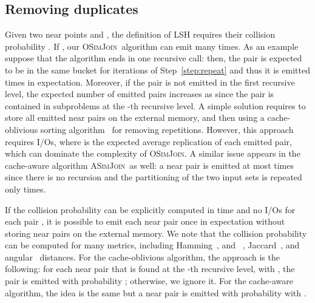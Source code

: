 \documentclass{llncs}
\newcommand{\SimJoin}{\textsc{OSimJoin}}
\newcommand{\ASimJoin}{\textsc{ASimJoin}}
\begin{document}
\subsection{Removing duplicates}\label{sec:remove-duplicates}

Given two near points  and , the definition of LSH requires their collision probability .
If , our \SimJoin\ algorithm can emit  many times. 
As an example suppose that the algorithm ends in one recursive call: then, the pair  is expected to be in the same bucket for  iterations of Step~\ref{step:repeat} and thus it is emitted  times in expectation. 
Moreover, if the pair is not emitted in the first recursive level, the expected number of emitted pairs increases as  since the pair  is contained in  subproblems at the -th recursive level.
A simple solution requires to store all emitted near pairs on the external memory, and then using a cache-oblivious sorting algorithm~\cite{frigo1999cache} for removing repetitions. 
However, this approach requires  I/Os, where  is the expected average replication of each emitted pair, which can dominate the complexity of \SimJoin.
A similar issue appears in the cache-aware algorithm \ASimJoin\ as well: a near pair is emitted at most  times since there is no recursion and the  partitioning of the two input sets is repeated only  times.

If the collision probability  can be explicitly computed in  time and no I/Os for each pair , it is possible to emit each near pair once in expectation without storing near pairs on the external memory. 
We note that the collision probability can be computed for many metrics, including Hamming~\cite{Indyk_STOC98},  and ~\cite{Datar_SOCG04},
Jaccard~\cite{Broder_NETWORK97}, and angular~\cite{Charikar_STOC02} distances. 
For the cache-oblivious algorithm, the approach is the following: for each near pair  that is found at the -th recursive level, with
, the pair is emitted with probability ; otherwise, we ignore it.
For the cache-aware algorithm, the idea is the same but a near pair is emitted with probability  with . 
\end{document}
